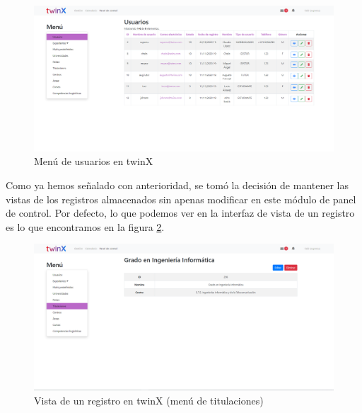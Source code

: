 \begin{figure}
	\centering
	\includegraphics[width=\textwidth]{Capturas de twinX/usuarios_twinX}
	\caption{Menú de usuarios en twinX}
	\label{fig:usuariostwinX}
\end{figure}

Como ya hemos señalado con anterioridad, se tomó la decisión de mantener las vistas de los registros almacenados sin apenas modificar en este módulo de panel de control. Por defecto, lo que podemos ver en la interfaz de vista de un registro es lo que encontramos en la figura \ref{fig:vistatitulaciontwinX}.

\begin{figure}
	\centering
	\includegraphics[width=\textwidth]{Capturas de twinX/vista_titulacion}
	\caption[Vista de un registro en twinX]{Vista de un registro en twinX (menú de titulaciones)}
	\label{fig:vistatitulaciontwinX}
\end{figure}

